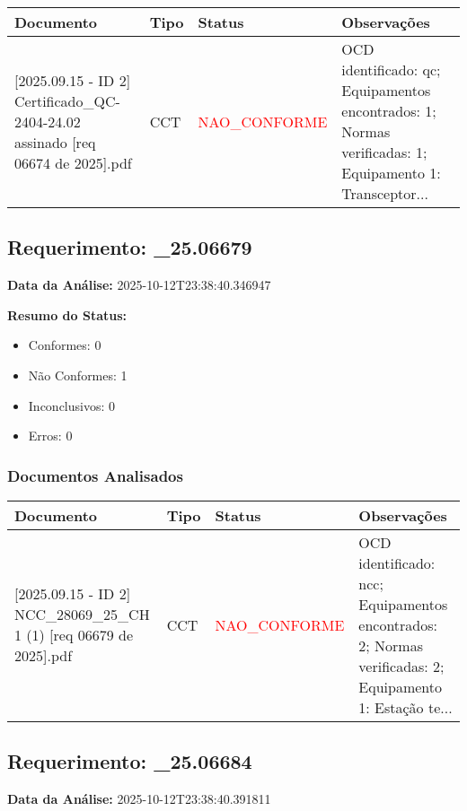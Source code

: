 \documentclass[12pt,a4paper]{article}
\begin{document}
\begin{longtable}{|p{4cm}|p{2cm}|p{2cm}|p{6cm}|}
\hline
\textbf{Documento} & \textbf{Tipo} & \textbf{Status} & \textbf{Observações} \\
\hline
\endhead
[Certificado de Conformidade Técnica - CCT][2025.09.15 - ID 2] Certificado\_QC-2404-24.02 assinado [req 06674 de 2025].pdf & CCT & \textcolor{red}{NAO\_CONFORME} & OCD identificado: qc; Equipamentos encontrados: 1; Normas verificadas: 1; Equipamento 1: Transceptor... \\
\hline
\end{longtable}


\subsection{Requerimento: \_25.06679}

\textbf{Data da Análise:} 2025-10-12T23:38:40.346947

\textbf{Resumo do Status:}
\begin{itemize}
    \item Conformes: 0
    \item Não Conformes: 1
    \item Inconclusivos: 0
    \item Erros: 0
\end{itemize}

\subsubsection{Documentos Analisados}

\begin{longtable}{|p{4cm}|p{2cm}|p{2cm}|p{6cm}|}
\hline
\textbf{Documento} & \textbf{Tipo} & \textbf{Status} & \textbf{Observações} \\
\hline
\endhead
[Certificado de Conformidade Técnica - CCT][2025.09.15 - ID 2] NCC\_28069\_25\_CH 1 (1) [req 06679 de 2025].pdf & CCT & \textcolor{red}{NAO\_CONFORME} & OCD identificado: ncc; Equipamentos encontrados: 2; Normas verificadas: 2; Equipamento 1: Estação te... \\
\hline
\end{longtable}


\subsection{Requerimento: \_25.06684}

\textbf{Data da Análise:} 2025-10-12T23:38:40.391811
\end{document}

